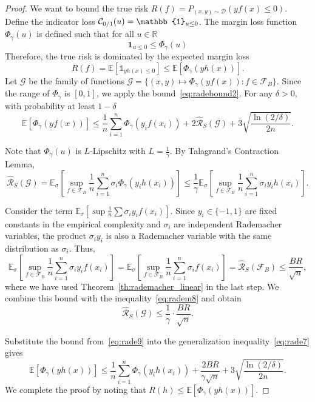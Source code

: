 \begin{proof}
We want to bound the true risk $R(f) = P_{(x,y) \sim \mathcal{D}}(yf(x) \leq 0)$. Define the indicator loss $\loss_{0/1}(u) = \mathbb{1}_{u \leq 0}$.
The margin loss function $\Phi_\gamma(u)$ is defined such that for all $u \in \mathbb{R}$
$$\mathbf{1}_{u \leq 0} \leq \Phi_\gamma(u)$$
Therefore, the true risk is dominated by the expected margin loss
$$R(f) = \mathbb{E}[\mathbb{1}_{yh(x) \leq 0}] \leq \mathbb{E}[\Phi_\gamma(yh(x))].$$
Let $\mathcal{G}$ be the family of functions $\mathcal{G} = \{ (x, y) \mapsto \Phi_\gamma(y f(x)) : f \in \mathcal{F}_B \}$. Since the range of $\Phi_\gamma$ is $[0, 1]$, we apply the bound~\eqref{eq:radebound2}. For any $\delta > 0$, with probability at least $1 - \delta$
\begin{equation}\label{eq:rade7}
\mathbb{E}[\Phi_\gamma(yf(x))] \leq \frac{1}{n} \sum_{i=1}^n \Phi_\gamma(y_i f(x_i)) + 2\hat{\mathcal{R}}_S(\mathcal{G}) + 3\sqrt{\frac{\ln(2/\delta)}{2n}}.\end{equation}

Note that $\Phi_\gamma(u)$ is $L$-Lipschitz with $L = \frac{1}{\gamma}$. By Talagrand’s Contraction Lemma,
\begin{equation}\label{eq:radem8}
\hat{\mathcal{R}}_S(\mathcal{G}) = \mathbb{E}_\sigma \left[ \sup_{f \in \mathcal{F}_B} \frac{1}{n} \sum_{i=1}^n \sigma_i \Phi_\gamma(y_i h(x_i)) \right] \leq \frac{1}{\gamma} \mathbb{E}_\sigma \left[ \sup_{f \in \mathcal{F}_B} \frac{1}{n} \sum_{i=1}^n \sigma_i y_i h(x_i) \right].
\end{equation}

Consider the term $\mathbb{E}_\sigma [ \sup \frac{1}{n} \sum \sigma_i y_i f(x_i) ]$. Since $y_i \in \{-1, 1\}$ are fixed constants in the empirical complexity and $\sigma_i$ are independent Rademacher variables, the product $\sigma_i y_i$ is also a Rademacher variable with the same distribution as $\sigma_i$. Thus,
$$\mathbb{E}_\sigma \left[ \sup_{f \in \mathcal{F}_B} \frac{1}{n} \sum_{i=1}^n \sigma_i y_i f(x_i) \right] = \mathbb{E}_\sigma \left[ \sup_{f \in \mathcal{F}_B} \frac{1}{n} \sum_{i=1}^n \sigma_i f(x_i) \right] = \hat{\mathcal{R}}_S(\mathcal{F}_B) \leq \frac{BR}{\sqrt{n}},$$
where we have used Theorem~\ref{th:rademacher_linear} in the last step.
We combine this bound with the inequality~\eqref{eq:radem8} and obtain
\begin{equation}\label{eq:rade9}
\hat{\mathcal{R}}_S(\mathcal{G}) \leq \frac{1}{\gamma} \cdot \frac{BR}{\sqrt{n}}.
\end{equation}

Substitute the  bound from~\eqref{eq:rade9} into the generalization inequality~\eqref{eq:rade7}
gives
$$\mathbb{E}[\Phi_\gamma(yh(x))] \leq \frac{1}{n} \sum_{i=1}^n \Phi_\gamma(y_i h(x_i)) + \frac{2BR}{\gamma \sqrt{n}} + 3\sqrt{\frac{\ln(2/\delta)}{2n}}.$$
We complete the proof by noting that
$R(h) \leq \mathbb{E}[\Phi_\gamma(yh(x))]$.

\end{proof}





